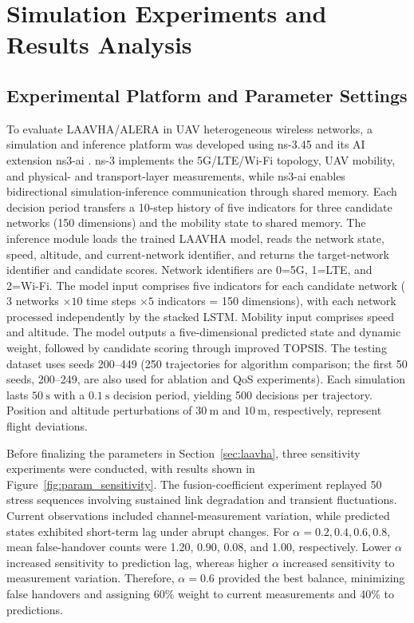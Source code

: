 \documentclass[final,3p,times,twocolumn]{elsarticle}
\begin{document}
\section{Simulation Experiments and Results Analysis}\label{sec:sim}

\subsection{Experimental Platform and Parameter Settings}\label{sec:platform}

To evaluate LAAVHA/ALERA in UAV heterogeneous wireless networks, a simulation and inference platform was developed using ns-3.45 \cite{ref32} and its AI extension ns3-ai \cite{ref33}. ns-3 implements the 5G/LTE/Wi-Fi topology, UAV mobility, and physical- and transport-layer measurements, while ns3-ai enables bidirectional simulation-inference communication through shared memory. Each decision period transfers a 10-step history of five indicators for three candidate networks (150 dimensions) and the mobility state to shared memory. The inference module loads the trained LAAVHA model, reads the network state, speed, altitude, and current-network identifier, and returns the target-network identifier and candidate scores. Network identifiers are 0=5G, 1=LTE, and 2=Wi-Fi. The model input comprises five indicators for each candidate network ($3$ networks $\times10$ time steps $\times5$ indicators = 150 dimensions), with each network processed independently by the stacked LSTM. Mobility input comprises speed and altitude. The model outputs a five-dimensional predicted state and dynamic weight, followed by candidate scoring through improved TOPSIS. The testing dataset uses seeds 200--449 (250 trajectories for algorithm comparison; the first 50 seeds, 200--249, are also used for ablation and QoS experiments). Each simulation lasts $50~\mathrm{s}$ with a $0.1~\mathrm{s}$ decision period, yielding 500 decisions per trajectory. Position and altitude perturbations of $30~\mathrm{m}$ and $10~\mathrm{m}$, respectively, represent flight deviations.

Before finalizing the parameters in Section~\ref{sec:laavha}, three sensitivity experiments were conducted, with results shown in Figure~\ref{fig:param_sensitivity}. The fusion-coefficient experiment replayed 50 stress sequences involving sustained link degradation and transient fluctuations. Current observations included channel-measurement variation, while predicted states exhibited short-term lag under abrupt changes. For $\alpha=0.2,0.4,0.6,0.8$, mean false-handover counts were 1.20, 0.90, 0.08, and 1.00, respectively. Lower $\alpha$ increased sensitivity to prediction lag, whereas higher $\alpha$ increased sensitivity to measurement variation. Therefore, $\alpha=0.6$ provided the best balance, minimizing false handovers and assigning 60\% weight to current measurements and 40\% to predictions.
\end{document}
